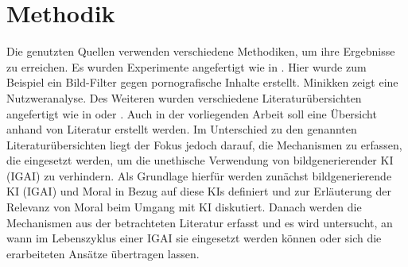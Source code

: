 \chapter{Methodik}

Die genutzten Quellen verwenden verschiedene Methodiken, um ihre Ergebnisse zu erreichen. Es wurden Experimente angefertigt wie in \cite[Blocking objectionable images]{Zheng}. Hier wurde zum Beispiel ein Bild-Filter gegen pornografische Inhalte erstellt. Minikken \cite{Minkkinen} zeigt eine Nutzweranalyse. Des Weiteren wurden verschiedene Literaturübersichten angefertigt wie in \cite[Biases in AI Systems]{Srinivasan} oder \cite[The global landscape of AI ethics guidelines]{Jobin}.
Auch in der vorliegenden Arbeit soll eine Übersicht anhand von Literatur erstellt werden. Im Unterschied zu den genannten Literaturübersichten liegt der Fokus jedoch darauf, die Mechanismen zu erfassen, die eingesetzt werden, um die unethische Verwendung von bildgenerierender KI (IGAI) zu verhindern. Als Grundlage hierfür werden zunächst bildgenerierende KI (IGAI) und Moral in Bezug auf diese KIs definiert und zur Erläuterung der
Relevanz von Moral beim Umgang mit KI diskutiert. Danach werden die Mechanismen aus der betrachteten Literatur erfasst und es wird untersucht, an wann im Lebenszyklus einer IGAI sie eingesetzt werden können oder sich die erarbeiteten Ansätze übertragen lassen.